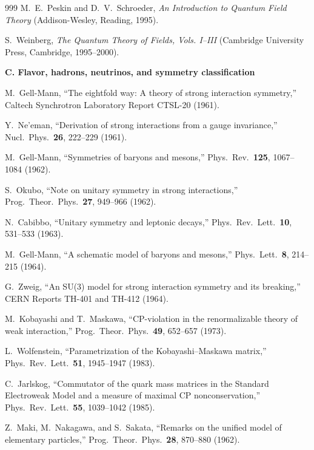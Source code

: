 \documentclass[11pt,a4paper,twoside]{book}
\theoremstyle{definition}
\begin{document}
\begin{thebibliography}{999}
M.~E.~Peskin and D.~V.~Schroeder,
\emph{An Introduction to Quantum Field Theory}
(Addison-Wesley, Reading, 1995).

S.~Weinberg,
\emph{The Quantum Theory of Fields, Vols. I--III}
(Cambridge University Press, Cambridge, 1995--2000).

\item[]\textbf{C. Flavor, hadrons, neutrinos, and symmetry classification}

M.~Gell-Mann,
``The eightfold way: A theory of strong interaction symmetry,''
Caltech Synchrotron Laboratory Report CTSL-20 (1961).

Y.~Ne'eman,
``Derivation of strong interactions from a gauge invariance,''
Nucl.\ Phys.\ \textbf{26}, 222--229 (1961).

M.~Gell-Mann,
``Symmetries of baryons and mesons,''
Phys.\ Rev.\ \textbf{125}, 1067--1084 (1962).

S.~Okubo,
``Note on unitary symmetry in strong interactions,''
Prog.\ Theor.\ Phys.\ \textbf{27}, 949--966 (1962).

N.~Cabibbo,
``Unitary symmetry and leptonic decays,''
Phys.\ Rev.\ Lett.\ \textbf{10}, 531--533 (1963).

M.~Gell-Mann,
``A schematic model of baryons and mesons,''
Phys.\ Lett.\ \textbf{8}, 214--215 (1964).

G.~Zweig,
``An SU(3) model for strong interaction symmetry and its breaking,''
CERN Reports TH-401 and TH-412 (1964).

M.~Kobayashi and T.~Maskawa,
``CP-violation in the renormalizable theory of weak interaction,''
Prog.\ Theor.\ Phys.\ \textbf{49}, 652--657 (1973).

L.~Wolfenstein,
``Parametrization of the Kobayashi--Maskawa matrix,''
Phys.\ Rev.\ Lett.\ \textbf{51}, 1945--1947 (1983).

C.~Jarlskog,
``Commutator of the quark mass matrices in the Standard Electroweak Model and
a measure of maximal CP nonconservation,''
Phys.\ Rev.\ Lett.\ \textbf{55}, 1039--1042 (1985).

Z.~Maki, M.~Nakagawa, and S.~Sakata,
``Remarks on the unified model of elementary particles,''
Prog.\ Theor.\ Phys.\ \textbf{28}, 870--880 (1962).


\end{thebibliography}
\end{document}
